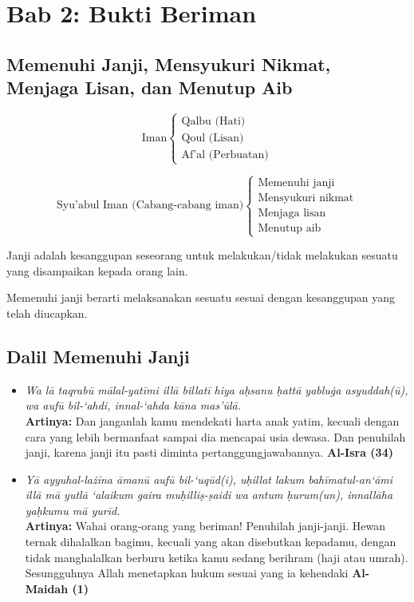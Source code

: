 \section{Bab 2: Bukti Beriman}
\subsection{Memenuhi Janji, Mensyukuri Nikmat, Menjaga Lisan, dan Menutup Aib}
\[
\text{Iman}
\begin{cases}
  \text{Qalbu (Hati)} \\
  \text{Qoul (Lisan)} \\
  \text{Af'al (Perbuatan)}
\end{cases}
\]

\[
\text{Syu'abul Iman (Cabang-cabang iman)}
\begin{cases}
  \text{Memenuhi janji} \\
  \text{Mensyukuri nikmat} \\
  \text{Menjaga lisan} \\
  \text{Menutup aib}
\end{cases}
\]

Janji adalah kesanggupan seseorang untuk melakukan/tidak melakukan sesuatu yang disampaikan kepada orang lain.


Memenuhi janji berarti melaksanakan sesuatu sesuai dengan kesanggupan yang telah diucapkan.

\subsection{Dalil Memenuhi Janji}
\begin{itemize}
\item \textit{Wa lā taqrabū mālal-yatīmi illā billatī hiya aḥsanu ḥattā yabluġa asyuddah(ū), wa aufū bil-‘ahdi, innal-‘ahda kāna mas'ūlā.} \\
  \textbf{Artinya: }Dan janganlah kamu mendekati harta anak yatim, kecuali dengan cara yang lebih bermanfaat sampai dia mencapai usia dewasa. Dan penuhilah janji, karena janji itu pasti diminta pertanggungjawabannya. \textbf{Al-Isra (34)}

\item \textit{Yā ayyuhal-lażīna āmanū aufū bil-‘uqūd(i), uḥillat lakum bahīmatul-an‘āmi illā mā yutlā ‘alaikum gaira muḥilliṣ-ṣaidi wa antum ḥurum(un), innallāha yaḥkumu mā yurīd.} \\
  \textbf{Artinya: }Wahai orang-orang yang beriman! Penuhilah janji-janji. Hewan ternak dihalalkan bagimu, kecuali yang akan disebutkan kepadamu, dengan tidak manghalalkan berburu ketika kamu sedang berihram (haji atau umrah). Sesungguhnya Allah menetapkan hukum sesuai yang ia kehendaki \textbf{Al-Maidah (1)}
\end{itemize}


